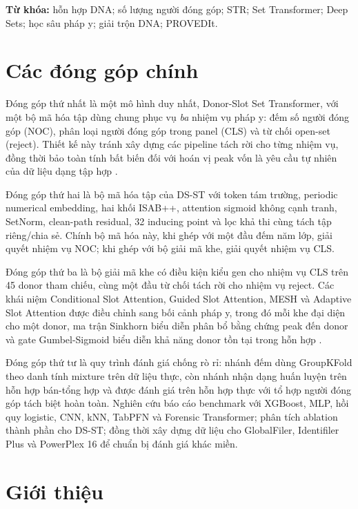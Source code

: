\documentclass[12pt,a4paper]{article}
\begin{document}
\medskip
\noindent\textbf{Từ khóa:} hỗn hợp DNA; số lượng người đóng góp; STR; Set Transformer; Deep Sets; học sâu pháp y; giải trộn DNA; PROVEDIt.

\section*{Các đóng góp chính}

Đóng góp thứ nhất là một mô hình duy nhất, Donor-Slot Set Transformer, với một bộ mã hóa tập dùng chung phục vụ \emph{ba} nhiệm vụ pháp y: đếm số người đóng góp (NOC), phân loại người đóng góp trong panel (CLS) và từ chối open-set (reject). Thiết kế này tránh xây dựng các pipeline tách rời cho từng nhiệm vụ, đồng thời bảo toàn tính bất biến đối với hoán vị peak vốn là yêu cầu tự nhiên của dữ liệu dạng tập hợp \cite{zaheer2017,lee2019}.

Đóng góp thứ hai là bộ mã hóa tập của DS-ST với token tám trường, periodic numerical embedding, hai khối ISAB++, attention sigmoid không cạnh tranh, SetNorm, clean-path residual, 32 inducing point và lọc khả thi cùng tách tập riêng/chia sẻ. Chính bộ mã hóa này, khi ghép với một đầu đếm năm lớp, giải quyết nhiệm vụ NOC; khi ghép với bộ giải mã khe, giải quyết nhiệm vụ CLS.

Đóng góp thứ ba là bộ giải mã khe có điều kiện kiểu gen cho nhiệm vụ CLS trên 45 donor tham chiếu, cùng một đầu từ chối tách rời cho nhiệm vụ reject. Các khái niệm Conditional Slot Attention, Guided Slot Attention, MESH và Adaptive Slot Attention được điều chỉnh sang bối cảnh pháp y, trong đó mỗi khe đại diện cho một donor, ma trận Sinkhorn biểu diễn phân bổ bằng chứng peak đến donor và gate Gumbel-Sigmoid biểu diễn khả năng donor tồn tại trong hỗn hợp \cite{ma2024cosa,lee2024gsa,zhang2023mesh,fan2024adaslot}.

Đóng góp thứ tư là quy trình đánh giá chống rò rỉ: nhánh đếm dùng GroupKFold theo danh tính mixture trên dữ liệu thực, còn nhánh nhận dạng huấn luyện trên hỗn hợp bán-tổng hợp và được đánh giá trên hỗn hợp thực với tổ hợp người đóng góp tách biệt hoàn toàn. Nghiên cứu báo cáo benchmark với XGBoost, MLP, hồi quy logistic, CNN, kNN, TabPFN và Forensic Transformer; phân tích ablation thành phần cho DS-ST; đồng thời xây dựng dữ liệu cho GlobalFiler, Identifiler Plus và PowerPlex 16 để chuẩn bị đánh giá khác miền.

\section{Giới thiệu}
\end{document}
